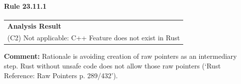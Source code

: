 \paragraph{Rule 23.11.1}
\begin{longtable}{p{13cm}}
\textbf{Analysis Result} \\
(C2) Not applicable: C++ Feature does not exist in Rust \\
\end{longtable}
\textbf{Comment:} Rationale is avoiding creation of raw pointers as an intermediary step. Rust without unsafe code does not allow those raw pointers (`Rust Reference: Raw Pointers p. 289/432'). \\
